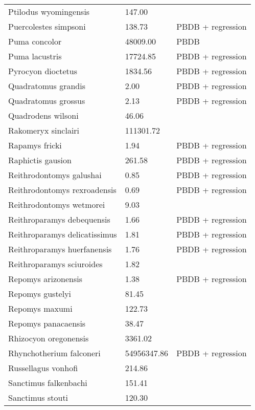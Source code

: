 \documentclass{article}
\begin{document}
\begin{center}
\begin{longtable}{p{} p{} p{}}
    Ptilodus wyomingensis & 147.00 & \cite{Wilson2012} \\ 
    Puercolestes simpsoni & 138.73 & PBDB + regression \\ 
    Puma concolor & 48009.00 & PBDB \\ 
    Puma lacustris & 17724.85 & PBDB + regression \\ 
    Pyrocyon dioctetus & 1834.56 & PBDB + regression \\ 
    Quadratomus grandis & 2.00 & PBDB + regression \\ 
    Quadratomus grossus & 2.13 & PBDB + regression \\ 
    Quadrodens wilsoni & 46.06 & \cite{Tomiya2013} \\ 
    Rakomeryx sinclairi & 111301.72 & \cite{Tomiya2013} \\ 
    Rapamys fricki & 1.94 & PBDB + regression \\ 
    Raphictis gausion & 261.58 & PBDB + regression \\ 
    Reithrodontomys galushai & 0.85 & PBDB + regression \\ 
    Reithrodontomys rexroadensis & 0.69 & PBDB + regression \\ 
    Reithrodontomys wetmorei & 9.03 & \cite{Tomiya2013} \\ 
    Reithroparamys debequensis & 1.66 & PBDB + regression \\ 
    Reithroparamys delicatissimus & 1.81 & PBDB + regression \\ 
    Reithroparamys huerfanensis & 1.76 & PBDB + regression \\ 
    Reithroparamys sciuroides & 1.82 & \cite{Wang1994a} \\ 
    Repomys arizonensis & 1.38 & PBDB + regression \\ 
    Repomys gustelyi & 81.45 & \cite{Tomiya2013} \\ 
    Repomys maxumi & 122.73 & \cite{Tomiya2013} \\ 
    Repomys panacaensis & 38.47 & \cite{Tomiya2013} \\ 
    Rhizocyon oregonensis & 3361.02 & \cite{Tomiya2013} \\ 
    Rhynchotherium falconeri & 54956347.86 & PBDB + regression \\ 
    Russellagus vonhofi & 214.86 & \cite{Tomiya2013} \\ 
    Sanctimus falkenbachi & 151.41 & \cite{Tomiya2013} \\ 
    Sanctimus stouti & 120.30 & \cite{Tomiya2013} \\ 

\end{longtable}
\end{center}
\end{document}
